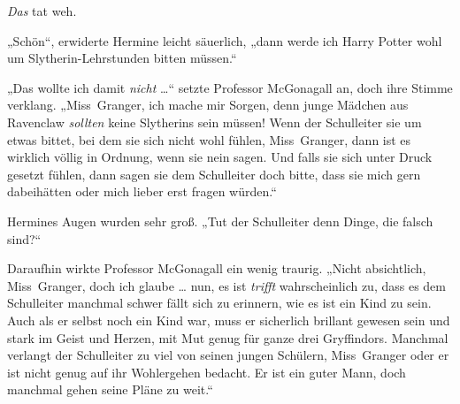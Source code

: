 \emph{Das} tat weh.

„Schön“, erwiderte Hermine leicht säuerlich, „dann werde ich Harry Potter wohl um Slytherin-Lehrstunden bitten müssen.“

„Das wollte ich damit \emph{nicht} …“ setzte Professor McGonagall an, doch ihre Stimme verklang.
„Miss~Granger, ich mache mir Sorgen, denn junge Mädchen aus Ravenclaw \emph{sollten} keine Slytherins sein müssen! Wenn der Schulleiter sie um etwas bittet, bei dem sie sich nicht wohl fühlen, Miss~Granger, dann ist es wirklich völlig in Ordnung, wenn sie nein sagen. Und falls sie sich unter Druck gesetzt fühlen, dann sagen sie dem Schulleiter doch bitte, dass sie mich gern dabeihätten oder mich lieber erst fragen würden.“

Hermines Augen wurden sehr groß.
„Tut der Schulleiter denn Dinge, die falsch sind?“

Daraufhin wirkte Professor McGonagall ein wenig traurig.
„Nicht absichtlich, Miss~Granger, doch ich glaube … nun, es ist \emph{trifft} wahrscheinlich zu, dass es dem Schulleiter manchmal schwer fällt sich zu erinnern, wie es ist ein Kind zu sein. Auch als er selbst noch ein Kind war, muss er sicherlich brillant gewesen sein und stark im Geist und Herzen, mit Mut genug für ganze drei Gryffindors. Manchmal verlangt der Schulleiter zu viel von seinen jungen Schülern, Miss~Granger oder er ist nicht genug auf ihr Wohlergehen bedacht. Er ist ein guter Mann, doch manchmal gehen seine Pläne zu weit.“

